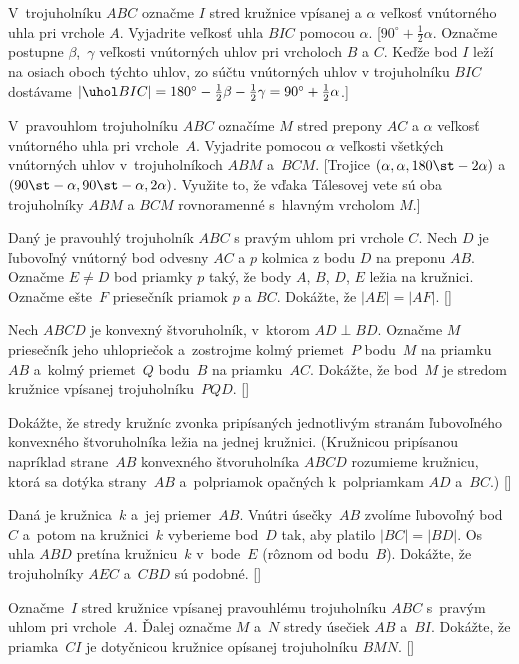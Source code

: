 {V~trojuholníku $ABC$ označme $I$ stred kružnice vpísanej a
$\alpha$ veľkosť vnútorného uhla pri vrchole $A$. Vyjadrite
veľkosť uhla $BIC$ pomocou $\alpha$.
[$90^\circ+\frac12\alpha$. Označme postupne $\beta$,~$\gamma$
veľkosti vnútorných uhlov pri vrcholoch $B$ a $C$. Keďže bod $I$ leží na osiach oboch týchto
uhlov, zo súčtu vnútorných uhlov v trojuholníku $BIC$ dostávame
$|\uhol BIC| = 180^\circ - \frac12\beta - \frac12\gamma=
90^\circ+\frac12\alpha$.]

V~pravouhlom trojuholníku $ABC$ označíme $M$ stred prepony $AC$
a $\alpha$ veľkosť vnútorného uhla pri vrchole~$A$.
Vyjadrite pomocou $\alpha$
veľkosti všetkých vnútorných uhlov v~trojuholníkoch $ABM$ a~$BCM$.
[Trojice $(\alpha,\alpha,180\st-2\alpha)$ a $(90\st-\alpha,90\st-\alpha,2\alpha)$.
Využite to, že vďaka Tálesovej vete sú oba trojuholníky $ABM$ a $BCM$
rovnoramenné s~hlavným vrcholom $M$.]

\D
Daný je pravouhlý trojuholník $ABC$ s pravým uhlom pri vrchole $C$.
Nech $D$ je ľubovoľný vnútorný bod odvesny $AC$ a $p$ kolmica z bodu $D$
na preponu $AB$. Označme $E\ne D$ bod priamky $p$ taký, že
body $A$, $B$, $D$, $E$ ležia na kružnici. Označme ešte~$F$
priesečník priamok $p$ a $BC$. Dokážte, že $|AE|=|AF|$.
[]

Nech $ABCD$ je konvexný štvoruholník, v~ktorom $AD\perp BD$. Označme $M$
priesečník jeho uhlopriečok a~zostrojme kolmý priemet~$P$ bodu~$M$ na
priamku~$AB$ a~kolmý priemet~$Q$ bodu~$B$ na priamku~$AC$.
Dokážte, že bod~$M$ je stredom kružnice vpísanej trojuholníku~$PQD$.
[]

Dokážte, že stredy kružníc zvonka pripísaných jednotlivým stranám
ľubovoľného konvexného štvoruholníka ležia na jednej kružnici.
\hfill\vadjust{\smallskip}\break
(Kružnicou pripísanou napríklad strane~$AB$ konvexného štvoruholníka $ABCD$ rozumieme
kružnicu, ktorá sa dotýka strany~$AB$ a~polpriamok opačných
k~polpriamkam $AD$ a~$BC$.)
[]

Daná je kružnica~$k$ a~jej priemer~$AB$. Vnútri úsečky~$AB$
zvolíme ľubovoľný bod~$C$ a~potom na kružnici~$k$ vyberieme bod~$D$
tak, aby platilo $|BC|=|BD|$. Os uhla $ABD$ pretína
kružnicu~$k$ v~bode~$E$ (rôznom od bodu~$B$).
Dokážte, že trojuholníky $AEC$ a~$CBD$ sú podobné.
[]

Označme~$I$ stred kružnice vpísanej pravouhlému trojuholníku $ABC$
s~pravým uhlom pri vrchole~$A$. Ďalej označme $M$ a~$N$ stredy
úsečiek $AB$ a~$BI$. Dokážte, že priamka~$CI$ je dotyčnicou kružnice
opísanej trojuholníku $BMN$.
[]

}

